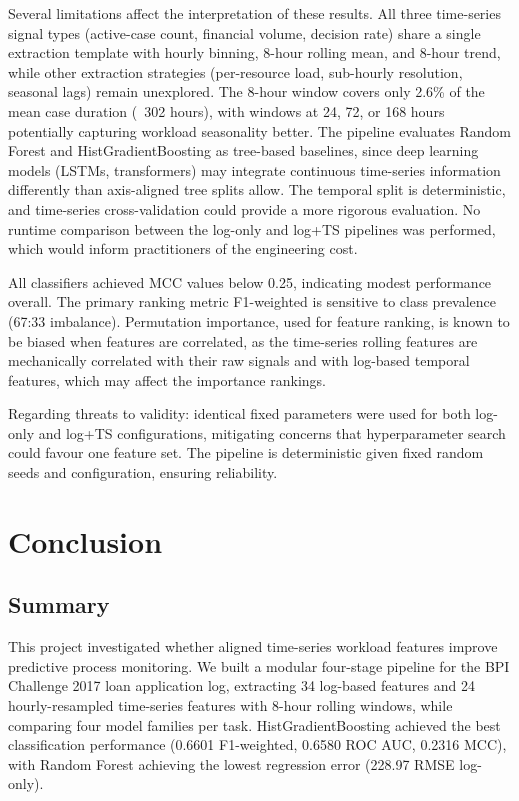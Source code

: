 \documentclass[runningheads]{llncs}
\begin{document}
Several limitations affect the interpretation of these results. All three
time-series signal types
(active-case count, financial volume, decision rate) share a single extraction
template with hourly binning, 8-hour rolling mean, and 8-hour trend, while
other extraction strategies (per-resource load, sub-hourly resolution,
seasonal lags) remain unexplored. The 8-hour window covers only 2.6\% of
the mean case duration (~302 hours), with windows at 24, 72, or 168 hours
potentially capturing workload seasonality better. The pipeline evaluates Random Forest and
HistGradientBoosting as tree-based baselines, since deep learning models
(LSTMs, transformers) may integrate continuous time-series information
differently than axis-aligned tree splits allow. The
temporal split is deterministic, and time-series cross-validation could
provide a more rigorous evaluation. No runtime comparison between the
log-only and log+TS pipelines was performed, which would inform
practitioners of the engineering cost.

All classifiers achieved MCC values below 0.25, indicating modest
performance overall. The primary ranking metric F1-weighted is sensitive
to class prevalence (67:33 imbalance). Permutation importance, used for
feature ranking, is known to be biased when features are correlated, as
the time-series rolling features are mechanically correlated with their raw
signals and with log-based temporal features, which may affect the
importance rankings.

Regarding threats to validity: identical fixed parameters were used for
both log-only and log+TS configurations, mitigating concerns that
hyperparameter search could favour one feature set. The pipeline is
deterministic given fixed random seeds and configuration, ensuring
reliability.

\section{Conclusion}
\label{sec:conclusion}

\subsection{Summary}
\label{sec:summary}

This project investigated whether aligned time-series workload features
improve predictive process monitoring. We built a modular four-stage
pipeline for the BPI Challenge 2017 loan application log, extracting
34 log-based features and 24 hourly-resampled time-series features
with 8-hour rolling windows, while comparing four model families per
task. HistGradientBoosting achieved the best classification performance
(0.6601 F1-weighted, 0.6580 ROC AUC, 0.2316 MCC), with Random Forest
achieving the lowest regression error (228.97 RMSE log-only).
\end{document}
